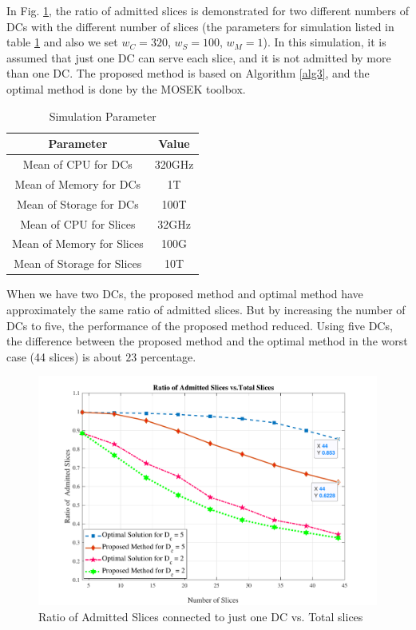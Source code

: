 \documentclass[conference]{IEEEtran}
\begin{document}
In Fig. \ref{fig:f1}, the ratio of admitted slices is demonstrated for two different numbers of DCs with the different number of slices (the parameters for simulation listed in table \ref{table:1} and also we set $w_C = 320$, $w_S = 100$, $w_M =1$). In this simulation, it is assumed that  just one DC can serve each slice, and it is not admitted by more than one DC. The proposed method is based on Algorithm \ref{alg3}, and the optimal method is done by the MOSEK toolbox.
\begin{small}
 \begin{table}
 \caption {Simulation Parameter} \label{table:1}
 \begin{center}
  \begin{tabular}{||c c ||}
  \hline
  Parameter & Value \\ [0.5ex]
  \hline\hline
  Mean of CPU for DCs & 320GHz\\
  \hline
  Mean of Memory for DCs & 1T\\
  \hline
 Mean of Storage for DCs & 100T \\
  \hline
   Mean of CPU for Slices & 32GHz\\
  \hline
  Mean of Memory for Slices & 100G\\
  \hline
 Mean of Storage for Slices & 10T \\ [1ex]
  \hline
 \end{tabular}
 \end{center}
 \end{table}
\end{small}
When we have two DCs, the proposed method and optimal method have approximately the same ratio of admitted slices. But by increasing the number of DCs to five, the performance of the proposed method reduced. Using five DCs, the difference between the
proposed method and the optimal method in the worst case (44 slices) is about $23$ percentage.
\begin{figure}%
  \centering
    \includegraphics[width=\linewidth]{f112}
  \caption{Ratio of Admitted Slices connected to just one DC vs. Total slices}
  \label{fig:f1}
\end{figure}
\end{document}
